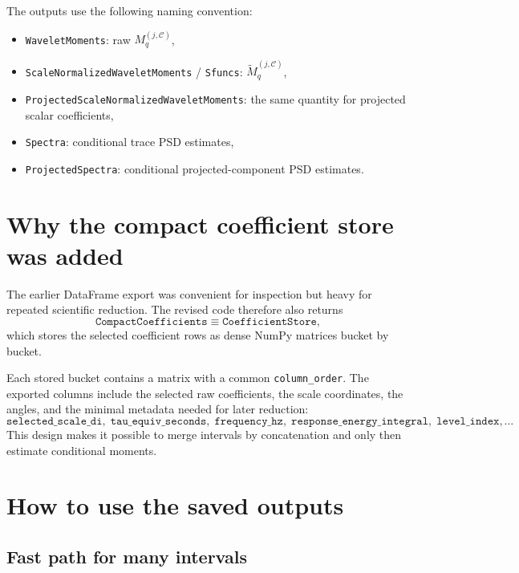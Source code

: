 \documentclass[11pt]{article}
\begin{document}
The outputs use the following naming convention:
\begin{itemize}[leftmargin=1.5em]
    \item \texttt{WaveletMoments}: raw $M_q^{(j,\mathcal C)}$,
    \item \texttt{ScaleNormalizedWaveletMoments} / \texttt{Sfuncs}: $\widetilde{M}_q^{(j,\mathcal C)}$,
    \item \texttt{ProjectedScaleNormalizedWaveletMoments}: the same quantity for projected scalar coefficients,
    \item \texttt{Spectra}: conditional trace PSD estimates,
    \item \texttt{ProjectedSpectra}: conditional projected-component PSD estimates.
\end{itemize}

\section{Why the compact coefficient store was added}

The earlier DataFrame export was convenient for inspection but heavy for repeated scientific reduction. The revised code therefore also returns
\begin{equation}
 \texttt{CompactCoefficients} \equiv \texttt{CoefficientStore},
\end{equation}
which stores the selected coefficient rows as dense NumPy matrices bucket by bucket.

Each stored bucket contains a matrix with a common \texttt{column\_order}. The exported columns include the selected raw coefficients, the scale coordinates, the angles, and the minimal metadata needed for later reduction:
\begin{equation}
 \texttt{selected\_scale\_di},\; \texttt{tau\_equiv\_seconds},\; \texttt{frequency\_hz},\; \texttt{response\_energy\_integral},\; \texttt{level\_index},\ldots
\end{equation}
This design makes it possible to merge intervals by concatenation and only then estimate conditional moments.

\section{How to use the saved outputs}

\subsection{Fast path for many intervals}
\end{document}
